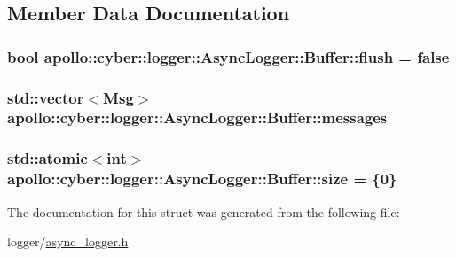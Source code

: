 \subsection{Member Data Documentation}
\hypertarget{structapollo_1_1cyber_1_1logger_1_1AsyncLogger_1_1Buffer_a56de07f3921488c1085e807ad40fda2c}{
\subsubsection[{flush}]{\setlength{\rightskip}{0pt plus 5cm}bool apollo\-::cyber\-::logger\-::\-Async\-Logger\-::\-Buffer\-::flush = false}}\label{structapollo_1_1cyber_1_1logger_1_1AsyncLogger_1_1Buffer_a56de07f3921488c1085e807ad40fda2c}
\hypertarget{structapollo_1_1cyber_1_1logger_1_1AsyncLogger_1_1Buffer_a8b95c833f3fccbe32a8b1dd9a814c018}{
\subsubsection[{messages}]{\setlength{\rightskip}{0pt plus 5cm}std\-::vector$<${\bf Msg}$>$ apollo\-::cyber\-::logger\-::\-Async\-Logger\-::\-Buffer\-::messages}}\label{structapollo_1_1cyber_1_1logger_1_1AsyncLogger_1_1Buffer_a8b95c833f3fccbe32a8b1dd9a814c018}
\hypertarget{structapollo_1_1cyber_1_1logger_1_1AsyncLogger_1_1Buffer_a48e0490978aeaa590cbe4a8697926a9a}{
\subsubsection[{size}]{\setlength{\rightskip}{0pt plus 5cm}std\-::atomic$<$int$>$ apollo\-::cyber\-::logger\-::\-Async\-Logger\-::\-Buffer\-::size = \{0\}}}\label{structapollo_1_1cyber_1_1logger_1_1AsyncLogger_1_1Buffer_a48e0490978aeaa590cbe4a8697926a9a}


The documentation for this struct was generated from the following file\-:\begin{DoxyCompactItemize}
\item 
logger/\hyperlink{async__logger_8h}{async\-\_\-logger.\-h}\end{DoxyCompactItemize}
